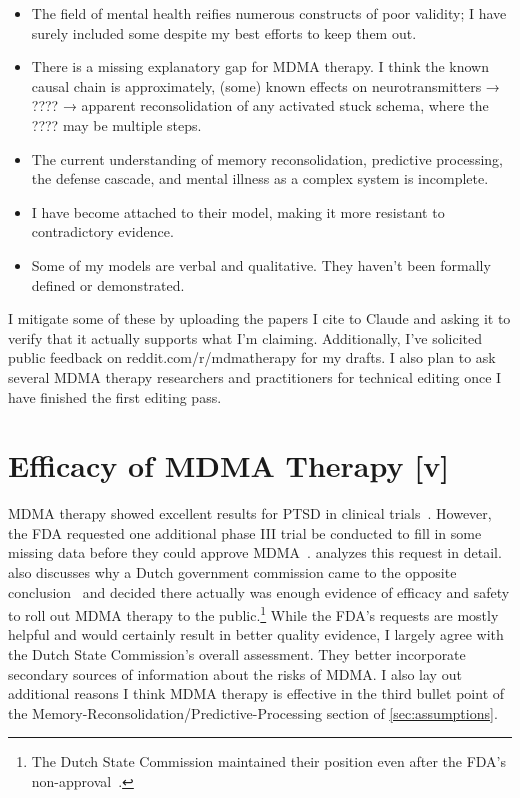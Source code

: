 \documentclass[11pt,oneside]{book}
\let\cite\parencite
\begin{document}
\begin{itemize}
    \item The field of mental health reifies numerous constructs of poor validity; I have surely included some despite my best efforts to keep them out.
    \item There is a missing explanatory gap for MDMA therapy. I think the known causal chain is approximately, (some) known effects on neurotransmitters → ???? → apparent reconsolidation of any activated stuck schema, where the ???? may be multiple steps.
    \item The current understanding of memory reconsolidation, predictive processing, the defense cascade, and mental illness as a complex system is incomplete.
    \item I have become attached to their model, making it more resistant to contradictory evidence.
    \item Some of my models are verbal and qualitative. They haven't been formally defined or demonstrated.
\end{itemize}

I mitigate some of these by uploading the papers I cite to Claude and asking it to verify that it actually supports what I'm claiming. Additionally, I've solicited public feedback on reddit.com/r/mdmatherapy for my drafts. I also plan to ask several MDMA therapy researchers and practitioners for technical editing once I have finished the first editing pass.

\section{Efficacy of MDMA Therapy [v]}
\label{efficacy}
MDMA therapy showed excellent results for PTSD in clinical trials~\cite{mitchellMDMAClinicalTrial,mitchellMDMAClinicalTrial2}. However, the FDA requested one additional phase III trial be conducted to fill in some missing data before they could approve MDMA~\cite{crl}. \textcite{crlAlpha} analyzes this request in detail. \textcite{fdaVSdutch} also discusses why a Dutch government commission came to the opposite conclusion~\cite{netherlandsMDMA} and decided there actually was enough evidence of efficacy and safety to roll out MDMA therapy to the public.\footnote{The Dutch State Commission maintained their position even after the FDA's non-approval~\cite{dutchParliment}.} While the FDA's requests are mostly helpful and would certainly result in better quality evidence, I largely agree with the Dutch State Commission's overall assessment. They better incorporate secondary sources of information about the risks of MDMA. I also lay out additional reasons I think MDMA therapy is effective in the third bullet point of the Memory-Reconsolidation/Predictive-Processing section of \cref{sec:assumptions}.
\end{document}
